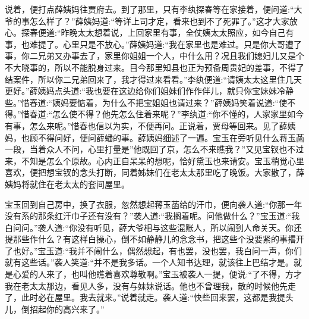 \begin{parag}
    说着，便打点薛姨妈往贾府去。到了那里，只有李纨探春等在家接着，便问道:“大爷的事怎么样了？”薛姨妈道:“等详上司才定，看来也到不了死罪了。”这才大家放心。探春便道:“昨晚太太想着说，上回家里有事，全仗姨太太照应，如今自己有事，也难提了。心里只是不放心。”薛姨妈道:“我在家里也是难过。只是你大哥遭了事，你二兄弟又办事去了，家里你姐姐一个人，中什么用？况且我们媳妇儿又是个不大晓事的，所以不能脱身过来。目今那里知县也正为预备周贵妃的差事，不得了结案件，所以你二兄弟回来了，我才得过来看看。”李纨便道:“请姨太太这里住几天更好。”薛姨妈点头道:“我也要在这边给你们姐妹们作作伴儿，就只你宝妹妹冷静些。”惜春道:“姨妈要惦着，为什么不把宝姐姐也请过来？”薛姨妈笑着说道:“使不得。”惜春道:“怎么使不得？他先怎么住着来呢？”李纨道:“你不懂的，人家家里如今有事，怎么来呢。”惜春也信以为实，不便再问。正说着，贾母等回来。见了薛姨妈，也顾不得问好，便问薛蟠的事。薛姨妈细述了一遍。宝玉在旁听见什么蒋玉菡一段，当着众人不问，心里打量是”他既回了京，怎么不来瞧我？”又见宝钗也不过来，不知是怎么个原故。心内正自呆呆的想呢，恰好黛玉也来请安。宝玉稍觉心里喜欢，便把想宝钗的念头打断，同着姊妹们在老太太那里吃了晚饭。大家散了，薛姨妈将就住在老太太的套间屋里。
\end{parag}


\begin{parag}
    宝玉回到自己房中，换了衣服，忽然想起蒋玉菡给的汗巾，便向袭人道:“你那一年没有系的那条红汗巾子还有没有？”袭人道:“我搁着呢。问他做什么？”宝玉道:“我白问问。”袭人道:“你没有听见，薛大爷相与这些混账人，所以闹到人命关天。你还提那些作什么？有这样白操心，倒不如静静儿的念念书，把这些个没要紧的事撂开了也好。”宝玉道:“我并不闹什么，偶然想起，有也罢，没也罢，我白问一声，你们就有这些话。”袭人笑道:“并不是我多话。一个人知书达理，就该往上巴结才是。就是心爱的人来了，也叫他瞧着喜欢尊敬啊。”宝玉被袭人一提，便说:“了不得，方才我在老太太那边，看见人多，没有与妹妹说话。他也不曾理我，散的时候他先走了，此时必在屋里。我去就来。”说着就走。袭人道:“快些回来罢，这都是我提头儿，倒招起你的高兴来了。”
\end{parag}


